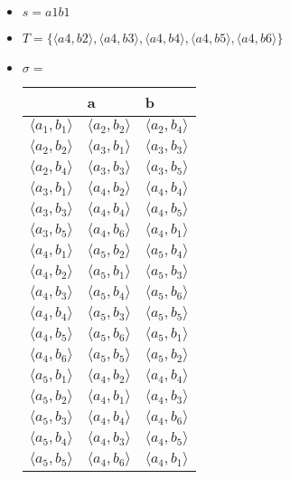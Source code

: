 \documentclass[10pt]{article}
\begin{document}
\begin{enumerate}
\begin{enumerate}[label*=\arabic*.]
\begin{itemize}
			\item $s=a1b1$\\
			\item $T=\{\langle a4,b2\rangle,\langle a4,b3\rangle,\langle a4,b4\rangle,\langle a4,b5\rangle,\langle a4,b6\rangle\}$\\
			\item $\sigma=$\\
			\begin{tabular}{ | l | l | l | }
				\hline
				& a & b \\ \hline
				$\langle a_1,b_1\rangle$ & $\langle a_2,b_2\rangle$ & $\langle a_2,b_4\rangle$ \\
				$\langle a_2,b_2\rangle$ & $\langle a_3,b_1\rangle$ & $\langle a_3,b_3\rangle$ \\
				$\langle a_2,b_4\rangle$ & $\langle a_3,b_3\rangle$ & $\langle a_3,b_5\rangle$ \\
				$\langle a_3,b_1\rangle$ & $\langle a_4,b_2\rangle$ & $\langle a_4,b_4\rangle$ \\
				$\langle a_3,b_3\rangle$ & $\langle a_4,b_4\rangle$ & $\langle a_4,b_5\rangle$ \\
				$\langle a_3,b_5\rangle$ & $\langle a_4,b_6\rangle$ & $\langle a_4,b_1\rangle$ \\
				$\langle a_4,b_1\rangle$ & $\langle a_5,b_2\rangle$ & $\langle a_5,b_4\rangle$ \\
				$\langle a_4,b_2\rangle$ & $\langle a_5,b_1\rangle$ & $\langle a_5,b_3\rangle$ \\
				$\langle a_4,b_3\rangle$ & $\langle a_5,b_4\rangle$ & $\langle a_5,b_6\rangle$ \\
				$\langle a_4,b_4\rangle$ & $\langle a_5,b_3\rangle$ & $\langle a_5,b_5\rangle$ \\
				$\langle a_4,b_5\rangle$ & $\langle a_5,b_6\rangle$ & $\langle a_5,b_1\rangle$ \\
				$\langle a_4,b_6\rangle$ & $\langle a_5,b_5\rangle$ & $\langle a_5,b_2\rangle$ \\
				$\langle a_5,b_1\rangle$ & $\langle a_4,b_2\rangle$ & $\langle a_4,b_4\rangle$ \\
				$\langle a_5,b_2\rangle$ & $\langle a_4,b_1\rangle$ & $\langle a_4,b_3\rangle$ \\
				$\langle a_5,b_3\rangle$ & $\langle a_4,b_4\rangle$ & $\langle a_4,b_6\rangle$ \\
				$\langle a_5,b_4\rangle$ & $\langle a_4,b_3\rangle$ & $\langle a_4,b_5\rangle$ \\
				$\langle a_5,b_5\rangle$ & $\langle a_4,b_6\rangle$ & $\langle a_4,b_1\rangle$ \\

\end{tabular}
\end{itemize}
\end{enumerate}
\end{enumerate}
\end{document}
